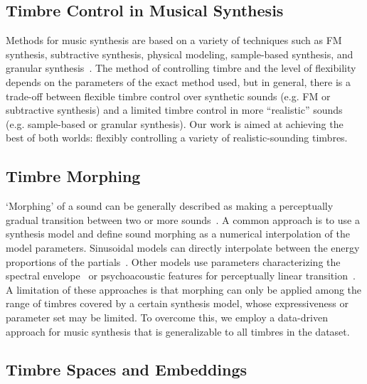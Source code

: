 
\subsection{Timbre Control in Musical Synthesis}

Methods for music synthesis are based on a variety of techniques such as FM synthesis, subtractive synthesis, physical modeling, sample-based synthesis, and granular synthesis~\cite{pejrolo2017creating}.
The method of controlling timbre and the level of flexibility depends on the parameters of the exact method used, but in general, there is a trade-off between flexible timbre control over synthetic sounds (e.g. FM or subtractive synthesis) and a limited timbre control in more ``realistic'' sounds (e.g. sample-based or granular synthesis). %
Our work is aimed at achieving the best of both worlds: flexibly controlling a variety of realistic-sounding timbres.

\pagebreak

\subsection{Timbre Morphing}

`Morphing' of a sound can be generally described as making a perceptually gradual transition between two or more sounds~\cite{caetano2010automatic}.
A common approach is to use a synthesis model and define sound morphing as a numerical interpolation of the model parameters.
Sinusoidal models can directly interpolate between the energy proportions of the partials~\cite{osaka1995timbre,boccardi2001sound}.
Other models use parameters characterizing the spectral envelope~\cite{slaney1996automatic,ezzat2005morphing} or psychoacoustic features for perceptually linear transition~\cite{caetano2013musical}.
A limitation of these approaches is that morphing can only be applied among the range of timbres covered by a certain synthesis model, whose expressiveness or parameter set may be limited.
To overcome this, we employ a data-driven approach for music synthesis that is generalizable to all timbres in the dataset.

\subsection{Timbre Spaces and Embeddings}

